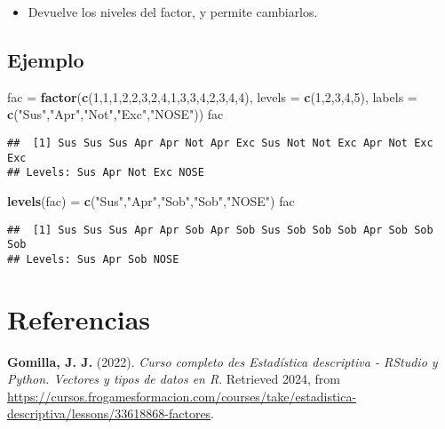 \documentclass[
]{article}
\newenvironment{Shaded}{\begin{snugshade}}{\end{snugshade}}
\newcommand{\AttributeTok}[1]{\textcolor[rgb]{0.13,0.29,0.53}{#1}}
\newcommand{\DecValTok}[1]{\textcolor[rgb]{0.00,0.00,0.81}{#1}}
\newcommand{\FunctionTok}[1]{\textcolor[rgb]{0.13,0.29,0.53}{\textbf{#1}}}
\newcommand{\NormalTok}[1]{#1}
\newcommand{\OtherTok}[1]{\textcolor[rgb]{0.56,0.35,0.01}{#1}}
\newcommand{\StringTok}[1]{\textcolor[rgb]{0.31,0.60,0.02}{#1}}
\providecommand{\tightlist}{%
  \setlength{\itemsep}{0pt}\setlength{\parskip}{0pt}}
\begin{document}
\begin{itemize}
\tightlist
\item
  Devuelve los niveles del factor, y permite cambiarlos.
\end{itemize}

\hypertarget{ejemplo}{%
\subsection{Ejemplo}\label{ejemplo}}

\begin{Shaded}
\begin{Highlighting}[]
\NormalTok{fac }\OtherTok{=} \FunctionTok{factor}\NormalTok{(}\FunctionTok{c}\NormalTok{(}\DecValTok{1}\NormalTok{,}\DecValTok{1}\NormalTok{,}\DecValTok{1}\NormalTok{,}\DecValTok{2}\NormalTok{,}\DecValTok{2}\NormalTok{,}\DecValTok{3}\NormalTok{,}\DecValTok{2}\NormalTok{,}\DecValTok{4}\NormalTok{,}\DecValTok{1}\NormalTok{,}\DecValTok{3}\NormalTok{,}\DecValTok{3}\NormalTok{,}\DecValTok{4}\NormalTok{,}\DecValTok{2}\NormalTok{,}\DecValTok{3}\NormalTok{,}\DecValTok{4}\NormalTok{,}\DecValTok{4}\NormalTok{), }
       \AttributeTok{levels =} \FunctionTok{c}\NormalTok{(}\DecValTok{1}\NormalTok{,}\DecValTok{2}\NormalTok{,}\DecValTok{3}\NormalTok{,}\DecValTok{4}\NormalTok{,}\DecValTok{5}\NormalTok{), }\AttributeTok{labels =} \FunctionTok{c}\NormalTok{(}\StringTok{"Sus"}\NormalTok{,}\StringTok{"Apr"}\NormalTok{,}\StringTok{"Not"}\NormalTok{,}\StringTok{"Exc"}\NormalTok{,}\StringTok{"NOSE"}\NormalTok{))}
\NormalTok{fac}
\end{Highlighting}
\end{Shaded}

\begin{verbatim}
##  [1] Sus Sus Sus Apr Apr Not Apr Exc Sus Not Not Exc Apr Not Exc Exc
## Levels: Sus Apr Not Exc NOSE
\end{verbatim}

\begin{Shaded}
\begin{Highlighting}[]
\FunctionTok{levels}\NormalTok{(fac) }\OtherTok{=} \FunctionTok{c}\NormalTok{(}\StringTok{"Sus"}\NormalTok{,}\StringTok{"Apr"}\NormalTok{,}\StringTok{"Sob"}\NormalTok{,}\StringTok{"Sob"}\NormalTok{,}\StringTok{"NOSE"}\NormalTok{)}
\NormalTok{fac}
\end{Highlighting}
\end{Shaded}

\begin{verbatim}
##  [1] Sus Sus Sus Apr Apr Sob Apr Sob Sus Sob Sob Sob Apr Sob Sob Sob
## Levels: Sus Apr Sob NOSE
\end{verbatim}

\pagebreak

\hypertarget{referencias}{%
\section{Referencias}\label{referencias}}

\textbf{Gomilla, J. J.} (2022). \emph{Curso completo des Estadística
descriptiva - RStudio y Python. Vectores y tipos de datos en R}.
Retrieved 2024, from
\url{https://cursos.frogamesformacion.com/courses/take/estadistica-descriptiva/lessons/33618868-factores}.
\end{document}
